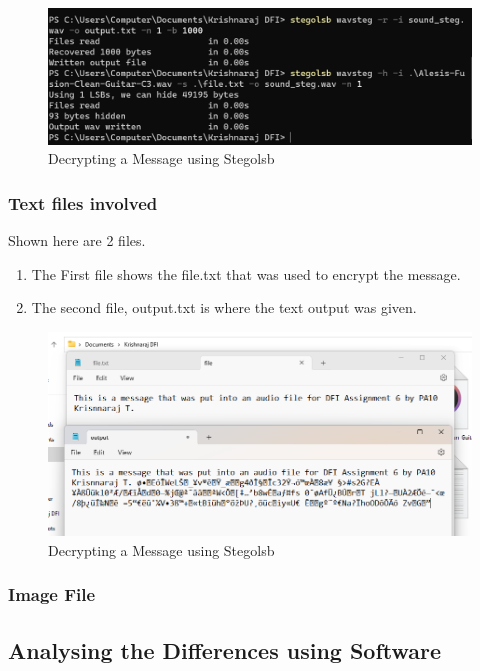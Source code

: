 \documentclass[11pt]{article}
\begin{document}
\begin{figure}[H]
    \centering
    \includegraphics[width=.95\textwidth]{./audio setg.png}
    \caption{Decrypting a Message using Stegolsb}
\end{figure}

\subsubsection{Text files involved}

Shown here are 2 files. 
\begin{enumerate}
    \item The First file shows the file.txt that was used to encrypt the message. 
    \item The second file, output.txt is where the text output was given. 
\end{enumerate}
\begin{figure}[H]
    \centering
    \includegraphics[width=.95\textwidth]{./text got and given.png}
    \caption{Decrypting a Message using Stegolsb}
\end{figure}

\subsubsection{Image File}

\subsection{Analysing the Differences using Software}
\end{document}
